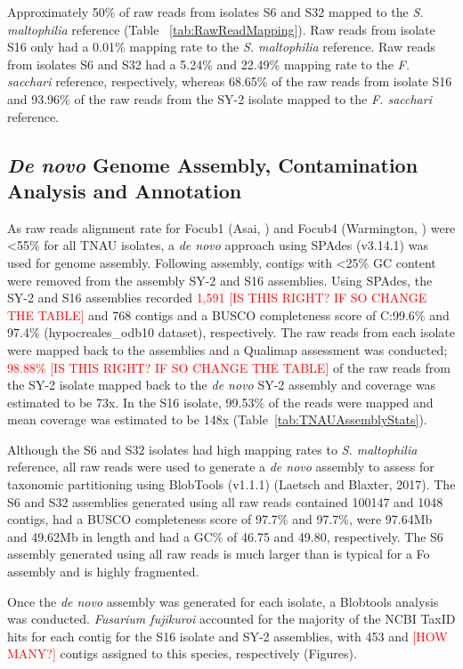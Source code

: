 Approximately 50\% of raw reads from isolates S6 and S32 mapped to the \textit{S. maltophilia} reference (Table ~\ref{tab:RawReadMapping}). Raw reads from isolate S16 only had a 0.01\% mapping rate to the \textit{S. maltophilia} reference. Raw reads from isolates S6 and S32 had a 5.24\% and 22.49\% mapping rate to the \textit{F. sacchari} reference, respectively, whereas 68.65\% of the raw reads from isolate S16 and 93.96\% of the raw reads from the SY-2 isolate mapped to the \textit{F. sacchari} reference.



\subsection{\textit{De novo} Genome Assembly, Contamination Analysis and Annotation}

As raw reads alignment rate for \ac{Focub1} (Asai, ) and \ac{Focub4} (Warmington, ) were <55\% for all TNAU isolates, a \textit{de novo} approach using SPAdes (v3.14.1) was used for genome assembly. Following assembly, contigs with \textless 25\% GC content were removed from the assembly SY-2 and S16 assemblies. Using SPAdes, the SY-2 and S16 assemblies recorded \textcolor{red}{1,591 [IS THIS RIGHT? IF SO CHANGE THE TABLE]} and 768 contigs and a BUSCO completeness score of C:99.6\% and 97.4\% (hypocreales\_odb10 dataset), respectively. The raw reads from each isolate were mapped back to the assemblies and a Qualimap assessment was conducted; \textcolor{red}{98.88\% [IS THIS RIGHT? IF SO CHANGE THE TABLE]} of the raw reads from the SY-2 isolate mapped back to the \textit{de novo} SY-2 assembly and coverage was estimated to be 73x. In the S16 isolate, 99.53\% of the reads were mapped and mean coverage was estimated to be 148x (Table~\ref{tab:TNAUAssemblyStats}).

Although the S6 and S32 isolates had high mapping rates to \textit{S. maltophilia} reference, all raw reads were used to generate a \textit{de novo} assembly to assess for taxonomic partitioning using BlobTools (v1.1.1) (Laetsch and Blaxter, 2017). The S6 and S32 assemblies generated using all raw reads contained 100147 and 1048 contigs, had a BUSCO completeness score of 97.7\% and 97.7\%, were 97.64Mb and 49.62Mb in length and had a GC\% of 46.75 and 49.80, respectively. The S6 assembly generated using all raw reads is much larger than is typical for a \ac{Fo} assembly and is highly fragmented. 

Once the \textit{de novo} assembly was generated for each isolate, a Blobtools analysis was conducted. \textit{Fusarium fujikuroi} accounted for the majority of the NCBI TaxID hits for each contig for the S16 isolate and SY-2 assemblies, with 453 and \textcolor{red}{[HOW MANY?]} contigs assigned to this species, respectively (Figures). 

